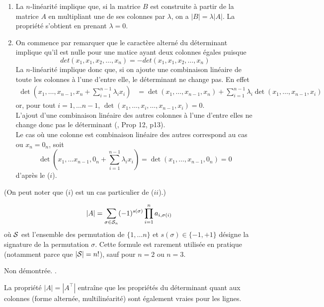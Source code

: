 \proof[Lemme]
  \begin{enumerate}[($i$)] 
  \item La $n$-linéarité implique que, si la matrice $B$ est construite à partir de la matrice $A$ en multipliant une de ses colonnes par $\lambda$, on a $|B| = \lambda |A|$. La propriété s'obtient en prenant $\lambda = 0$.
  \item On commence par remarquer que le caractère alterné du déterminant implique qu'il est nulle pour une matice ayant deux colonnes égales puisque
  $$
  det(x_1, x_1, x_2,\dots, x_n) = -det(x_1, x_1, x_2,\dots, x_n)
  $$
  La $n$-linéarité implique donc que, si on ajoute une combinaison linéaire de toute les colonnes à l'une d'entre elle, le déterminant ne change pas. En effet
  \begin{align*}
    \det\left(x_1, \dots, x_{n-1}, x_n + \sum_{i=1}^{n-1} \lambda_i x_i\right)
    & = \det\left(x_1, \dots, x_{n-1}, x_n\right)
    + \sum_{i=1}^{n-1} \lambda_i \det\left(x_1, \dots, x_{n-1}, x_i\right)
  \end{align*}
  or, pour tout $i = 1, \dots n-1$, $ \det\left(x_1, \dots, x_i, \dots, x_{n-1}, x_i\right) = 0$. \\
  L'ajout d'une combinaison linéaire des autres colonnes à l'une d'entre elles ne change donc pas le déterminant (\cite{GAJ94}, Prop 12, p13). \\
  Le cas où une colonne est combinaison linéaire des autres correspond au cas ou $x_n = 0_n$, soit
  $$
  \det\left(x_1, \dots x_{n-1}, 0_n + \sum_{i=1}^{n-1} \lambda_i x_i\right)
  = \det\left(x_1, \dots, x_{n-1}, 0_n\right)
  = 0
  $$
  d'après le ($i$).
  \end{enumerate}
  (On peut noter que ($i$) est un cas particulier de ($ii$).)
\eproof

\begin{proposition*}
  \begin{equation} \label{eq:determinant}
    |A| = \sum_{\sigma \in \mathcal{S}_n} (-1)^{s(\sigma)} \prod_{i=1}^n a_{i, \sigma(i)} 
    \end{equation}
    où $\mathcal{S}$ est l'ensemble des permutation de $\{1, \dots n\}$ et $s(\sigma) \in \{-1, +1\}$ désigne la signature de la permutation $\sigma$. Cette formule est rarement utilisée en pratique (notamment parce que $|\mathcal{S}| = n!$), sauf pour $n=2$ ou $n=3$.
\end{proposition*}

\proof Non démontrée. \eproof.

\remark La propriété $|A| = |A^\top|$ entraîne que les propriétés du déterminant quant aux colonnes (forme alternée, multilinéarité) sont également vraies pour les lignes. 

